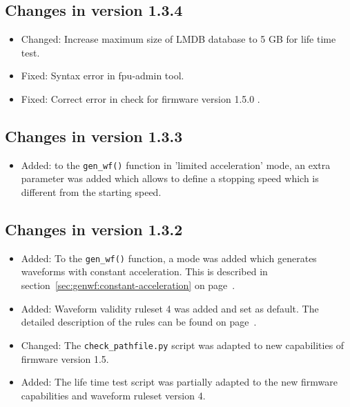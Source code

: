 \documentclass[11pt,a4paper]{scrartcl}
\begin{document}
\subsection*{Changes in version 1.3.4}
\begin{itemize}
\item Changed: Increase maximum size of LMDB database to 5 GB for life time test.
\item Fixed: Syntax error in fpu-admin tool.
\item Fixed: Correct error in check for firmware version 1.5.0 .
\end{itemize}


\subsection*{Changes in version 1.3.3}
\begin{itemize}
\item Added: to the \texttt{gen\_wf()} function in 'limited
  acceleration' mode, an extra parameter was added which allows to
  define a stopping speed which is different from the starting speed.
\end{itemize}

\subsection*{Changes in version 1.3.2}
\begin{itemize}
\item Added: To the \texttt{gen\_wf()} function, a mode
  was added which generates waveforms with constant acceleration.
  This is described in section~\ref{sec:genwf:constant-acceleration}
  on page~\pageref{sec:genwf:constant-acceleration}.

\item Added: Waveform validity ruleset 4 was added and set as default.
  The detailed description of the rules can be found on
  page~\pageref{sec:wfrulesetv4}.

\item Changed: The \texttt{check\_pathfile.py} script was adapted to
  new capabilities of firmware version 1.5.

\item Added: The life time test script was partially adapted to the
  new firmware capabilities and waveform ruleset version 4.
  
\end{itemize}
\end{document}
